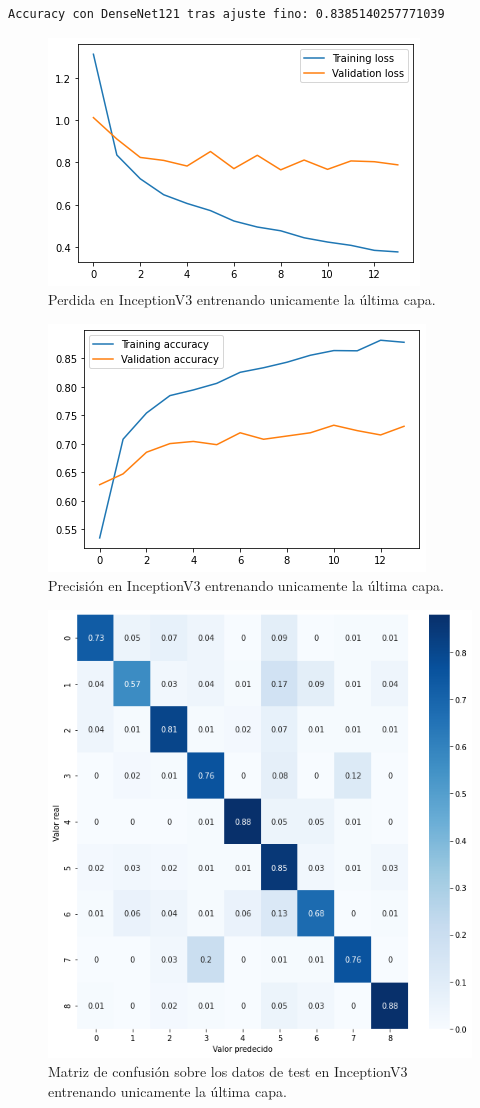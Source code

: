 \begin{lstlisting}
Accuracy con DenseNet121 tras ajuste fino: 0.8385140257771039
\end{lstlisting}





\begin{figure}[H]
  \centering
  \includegraphics[width=0.5\linewidth]{Imagenes/entrenamiento_redes/ult/inception_ult_loss.png}
  \caption{Perdida en InceptionV3 entrenando unicamente la última capa.}
\end{figure}

\begin{figure}[H]
  \centering
  \includegraphics[width=0.5\linewidth]{Imagenes/entrenamiento_redes/ult/inception_ult_acc.png}
  \caption{Precisión en InceptionV3 entrenando unicamente la última capa.}
\end{figure}

\begin{figure}[H]
  \centering
  \includegraphics[width=0.5\linewidth]{Imagenes/entrenamiento_redes/ult/inception_ult_matriz.png}
  \caption{Matriz de confusión sobre los datos de test en InceptionV3 entrenando unicamente la última capa.}
\end{figure}


